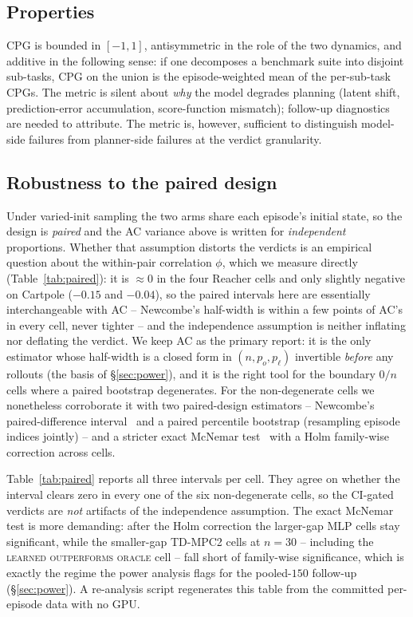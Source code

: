 \documentclass[10pt,letterpaper]{article}
\begin{document}
\subsection{Properties}

CPG is bounded in $[-1, 1]$, antisymmetric in the role of the two dynamics, and additive in the following sense: if one decomposes a benchmark suite into disjoint sub-tasks, CPG on the union is the episode-weighted mean of the per-sub-task CPGs. The metric is silent about \emph{why} the model degrades planning (latent shift, prediction-error accumulation, score-function mismatch); follow-up diagnostics are needed to attribute. The metric is, however, sufficient to distinguish model-side failures from planner-side failures at the verdict granularity.

\subsection{Robustness to the paired design}
\label{sec:paired}

Under varied-init sampling the two arms share each episode's initial state, so the design is \emph{paired} and the AC variance above is written for \emph{independent} proportions. Whether that assumption distorts the verdicts is an empirical question about the within-pair correlation $\phi$, which we measure directly (Table~\ref{tab:paired}): it is $\approx 0$ in the four Reacher cells and only slightly negative on Cartpole ($-0.15$ and $-0.04$), so the paired intervals here are essentially interchangeable with AC -- Newcombe's half-width is within a few points of AC's in every cell, never tighter -- and the independence assumption is neither inflating nor deflating the verdict. We keep AC as the primary report: it is the only estimator whose half-width is a closed form in $(n, p_o, p_\ell)$ invertible \emph{before} any rollouts (the basis of \S\ref{sec:power}), and it is the right tool for the boundary $0/n$ cells where a paired bootstrap degenerates. For the non-degenerate cells we nonetheless corroborate it with two paired-design estimators -- Newcombe's paired-difference interval~\citep{newcombe1998paired} and a paired percentile bootstrap (resampling episode indices jointly) -- and a stricter exact McNemar test~\citep{mcnemar1947} with a Holm family-wise correction across cells.

Table~\ref{tab:paired} reports all three intervals per cell. They agree on whether the interval clears zero in every one of the six non-degenerate cells, so the CI-gated verdicts are \emph{not} artifacts of the independence assumption. The exact McNemar test is more demanding: after the Holm correction the larger-gap MLP cells stay significant, while the smaller-gap TD-MPC2 cells at $n = 30$ -- including the \textsc{learned outperforms oracle} cell -- fall short of family-wise significance, which is exactly the regime the power analysis flags for the pooled-$150$ follow-up (\S\ref{sec:power}). A re-analysis script regenerates this table from the committed per-episode data with no GPU.
\end{document}
